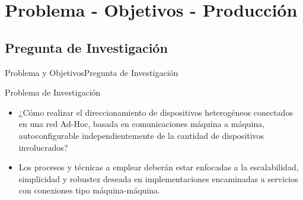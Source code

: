 \section{Problema - Objetivos - Producción}
\subsection{Pregunta de Investigación}
\begin{frame}{Problema y Objetivos}{Pregunta de Investigación}
  \begin{block}{Problema de Investigación}
   \begin{itemize}
   \justifying
    \item<1->  ¿Cómo realizar el direccionamiento de dispositivos heterogéneos conectados en una red Ad-Hoc, basada en comunicaciones máquina a máquina, autoconfigurable independientemente de la cantidad de dispositivos involucrados? 
    \item<1->  Los procesos y técnicas a emplear deberán estar enfocadas a la escalabilidad, simplicidad y robustez deseada en implementaciones encaminadas a servicios con conexiones tipo máquina-máquina.
    \end{itemize}
  \end{block}
\end{frame}

